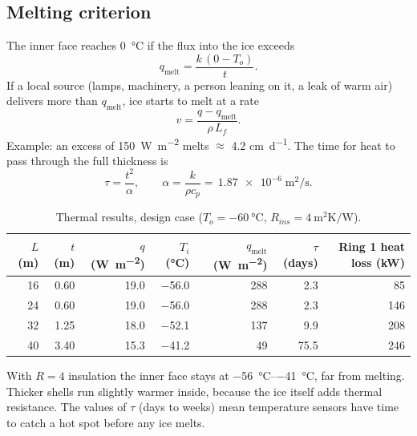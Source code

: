 \documentclass[11pt,a4paper]{article}
\begin{document}
\subsection{Melting criterion}
The inner face reaches \SI{0}{\celsius} if the flux into the ice exceeds
\begin{equation}
q_{\text{melt}}=\frac{k\,(0-T_o)}{t}.
\end{equation}
If a local source (lamps, machinery, a person leaning on it, a leak of warm air) delivers more than $q_{\text{melt}}$, ice starts to melt at a rate
\begin{equation}
v=\frac{q-q_{\text{melt}}}{\rho\,L_f}.
\end{equation}
Example: an excess of \SI{150}{\watt\per\metre\squared} melts $\approx$ \num{4.2} \si{\centi\metre\per\day}. The time for heat to pass through the full thickness is
\begin{equation}
\tau=\frac{t^2}{\alpha},\qquad \alpha=\frac{k}{\rho c_p}=\,\num{1.87e-6}\;\si{\metre\squared\per\second}.
\end{equation}

\begin{table}[h]\centering\small
\caption{Thermal results, design case ($T_o=\SI{-60}{\celsius}$, $R_{ins}=\SI{4}{\metre\squared\kelvin\per\watt}$).}
\begin{tabular}{rrrrrrr}\toprule
$L$ (\si{\metre}) & $t$ (\si{\metre}) & $q$ (\si{\watt\per\metre\squared}) & $T_i$ (\si{\celsius}) & $q_{\text{melt}}$ (\si{\watt\per\metre\squared}) & $\tau$ (days) & Ring 1 heat loss (\si{\kilo\watt}) \\\midrule
\num{16} & \num{0.60} & \num{19.0} & \num{-56.0} & \num{288} & \num{2.3} & \num{85} \\
\num{24} & \num{0.60} & \num{19.0} & \num{-56.0} & \num{288} & \num{2.3} & \num{146} \\
\num{32} & \num{1.25} & \num{18.0} & \num{-52.1} & \num{137} & \num{9.9} & \num{208} \\
\num{40} & \num{3.40} & \num{15.3} & \num{-41.2} & \num{49} & \num{75.5} & \num{246} \\
\bottomrule\end{tabular}
\end{table}

With $R=4$ insulation the inner face stays at \SIrange{-56}{-41}{\celsius}, far from melting. Thicker shells run slightly warmer inside, because the ice itself adds thermal resistance. The values of $\tau$ (days to weeks) mean temperature sensors have time to catch a hot spot before any ice melts.
\end{document}
